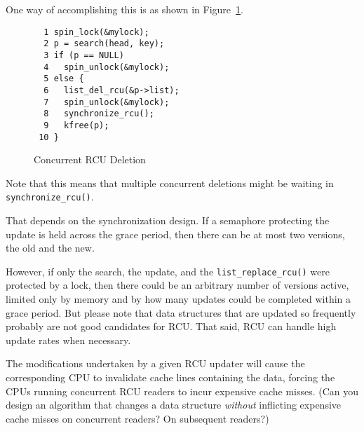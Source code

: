 
One way of accomplishing this is as shown in
Figure~\ref{fig:defer:Concurrent RCU Deletion}.

\begin{figure}[htbp]
{ \centering
\begin{verbatim}
  1 spin_lock(&mylock);
  2 p = search(head, key);
  3 if (p == NULL)
  4   spin_unlock(&mylock);
  5 else {
  6   list_del_rcu(&p->list);
  7   spin_unlock(&mylock);
  8   synchronize_rcu();
  9   kfree(p);
 10 }
\end{verbatim}
}
\caption{Concurrent RCU Deletion}
\label{fig:defer:Concurrent RCU Deletion}
\end{figure}

Note that this means that multiple concurrent deletions might be
waiting in {\tt synchronize\_rcu()}.


That depends on the synchronization design.
If a semaphore protecting the update is held across the grace period,
then there can be at most two versions, the old and the new.

However, if only the search, the update, and the
{\tt list\_replace\_rcu()} were protected by a lock, then
there could be an arbitrary number of versions active, limited only
by memory and by how many updates could be completed within a
grace period.
But please note that data structures that are updated so frequently
probably are not good candidates for RCU.
That said, RCU can handle high update rates when necessary.


The modifications undertaken by a given RCU updater will cause the
corresponding CPU to invalidate cache lines containing the data,
forcing the CPUs running concurrent RCU readers to incur expensive
cache misses.
(Can you design an algorithm that changes a data structure \emph{without}
inflicting expensive cache misses on concurrent readers?
On subsequent readers?)


